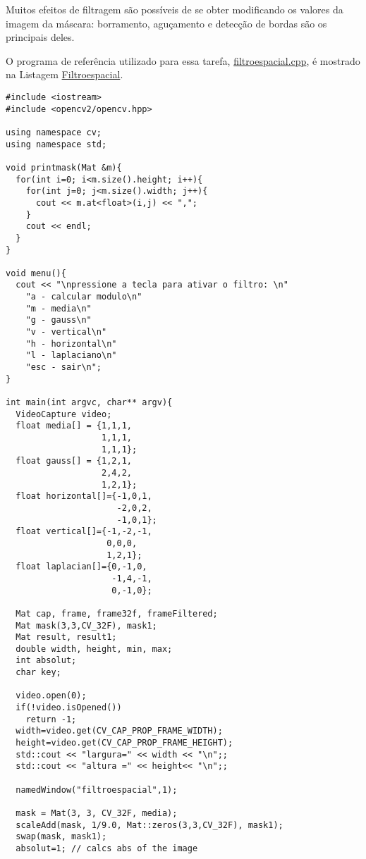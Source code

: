 \documentclass[11pt]{amsbook}
\begin{document}
Muitos efeitos de filtragem são possíveis de se obter modificando os
valores da imagem da máscara: borramento, aguçamento e detecção de
bordas são os principais deles.


O programa de referência utilizado para essa tarefa,
\href{exemplos/filtroespacial.cpp}{filtroespacial.cpp}, é mostrado na
Listagem \hyperlink{exa-filtroespacial}{Filtroespacial}.


\begin{verbatim}
#include <iostream>
#include <opencv2/opencv.hpp>

using namespace cv;
using namespace std;

void printmask(Mat &m){
  for(int i=0; i<m.size().height; i++){
    for(int j=0; j<m.size().width; j++){
      cout << m.at<float>(i,j) << ",";
    }
    cout << endl;
  }
}

void menu(){
  cout << "\npressione a tecla para ativar o filtro: \n"
	"a - calcular modulo\n"
    "m - media\n"
    "g - gauss\n"
    "v - vertical\n"
	"h - horizontal\n"
    "l - laplaciano\n"
	"esc - sair\n";
}

int main(int argvc, char** argv){
  VideoCapture video;
  float media[] = {1,1,1,
				   1,1,1,
				   1,1,1};
  float gauss[] = {1,2,1,
				   2,4,2,
				   1,2,1};
  float horizontal[]={-1,0,1,
					  -2,0,2,
					  -1,0,1};
  float vertical[]={-1,-2,-1,
					0,0,0,
					1,2,1};
  float laplacian[]={0,-1,0,
					 -1,4,-1,
					 0,-1,0};

  Mat cap, frame, frame32f, frameFiltered;
  Mat mask(3,3,CV_32F), mask1;
  Mat result, result1;
  double width, height, min, max;
  int absolut;
  char key;

  video.open(0);
  if(!video.isOpened())
    return -1;
  width=video.get(CV_CAP_PROP_FRAME_WIDTH);
  height=video.get(CV_CAP_PROP_FRAME_HEIGHT);
  std::cout << "largura=" << width << "\n";;
  std::cout << "altura =" << height<< "\n";;

  namedWindow("filtroespacial",1);

  mask = Mat(3, 3, CV_32F, media);
  scaleAdd(mask, 1/9.0, Mat::zeros(3,3,CV_32F), mask1);
  swap(mask, mask1);
  absolut=1; // calcs abs of the image


\end{verbatim}
\end{document}
